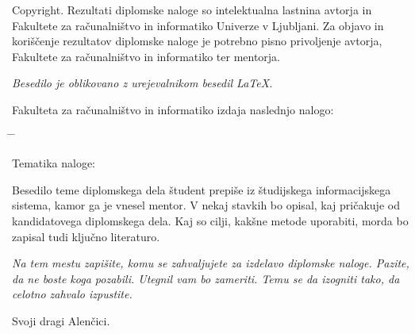 \documentclass[a4paper, 12pt]{book}
\newcommand{\clearemptydoublepage}{\newpage{\pagestyle{empty}\cleardoublepage}}
\begin{document}
\noindent
{\sc Copyright}. 
Rezultati diplomske naloge so intelektualna lastnina avtorja in Fakultete za računalništvo in informatiko Univerze v Ljubljani.
Za objavo in koriščenje rezultatov diplomske naloge je potrebno pisno privoljenje avtorja, Fakultete za računalništvo in informatiko ter mentorja.

\begin{center}
\mbox{}\vfill
\emph{Besedilo je oblikovano z urejevalnikom besedil \LaTeX.}
\end{center}
\clearemptydoublepage

\thispagestyle{empty}
\vspace*{4cm}

\noindent
Fakulteta za računalništvo in informatiko izdaja naslednjo nalogo:
\medskip
\begin{tabbing}
\hspace{32mm}\= \hspace{6cm} \= \kill


Tematika naloge:
\end{tabbing}
Besedilo teme diplomskega dela študent prepiše iz študijskega informacijskega sistema, kamor ga je vnesel mentor. V nekaj stavkih bo opisal, kaj pričakuje od kandidatovega diplomskega dela. Kaj so cilji, kakšne metode uporabiti, morda bo zapisal tudi ključno literaturo.
\vspace{15mm}




\vspace{2cm}

\clearemptydoublepage

\thispagestyle{empty}\mbox{}\vfill\null\it%
\noindent
Na tem mestu zapišite, komu se zahvaljujete za izdelavo diplomske naloge. Pazite, da ne boste koga pozabili. Utegnil vam bo zameriti. Temu se da izogniti tako, da celotno zahvalo izpustite.
\rm\normalfont

\clearemptydoublepage

\thispagestyle{empty}\mbox{}{\textheight}\mbox{}\hfill\begin{minipage}{0.55\textwidth}%
Svoji dragi Alenčici.
\normalfont\end{minipage}

\clearemptydoublepage


\pagestyle{empty}
\def\thepage{}%
\tableofcontents{}
\end{document}

